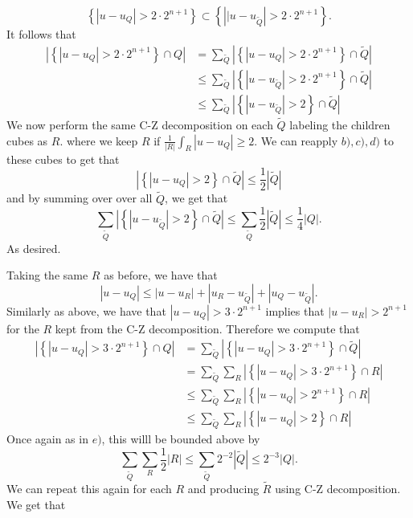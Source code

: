 \documentclass[12pt, a4paper]{article}
\theoremstyle{definition}
\begin{document}
$$ \left\{ \left| u-u_Q \right|> 2 \cdot 2^{n+1} \right\} \subset \left\{ \left| |u-u_{\tilde{Q}} \right|>2 \cdot 2^{n+1} \right\}. $$ 
It follows that 
\begin{align*}
	\left| \left\{ \left| u-u_Q \right|>2\cdot 2^{n+1} \right\}\cap Q  \right| & = 	\sum_{\tilde{Q}}\left| \left\{ \left| u-u_Q \right|>2\cdot 2^{n+1} \right\}\cap \tilde{Q}  \right| 
	\\ & \leq \sum_{\tilde{Q}}\left| \left\{ \left| u-u_{\tilde{Q}} \right|>2\cdot 2^{n+1} \right\}\cap \tilde{Q}  \right|
	\\ & \leq \sum_{\tilde{Q}}\left| \left\{ \left| u-u_{\tilde{Q}} \right|>2 \right\}\cap \tilde{Q}  \right|
\end{align*}
We now perform the same C-Z decomposition on each $\tilde{Q}$ labeling the children cubes as $R$. where we keep $R$ if $ \frac{1}{|R|}\int_R |u-u_Q| \geq 2 $. We can reapply $b),c),d)$ to these cubes to get that 
$$ \left| \left\{ \left| u-u_Q \right|>2 \right\}\cap \tilde{Q} \right|\leq \frac{1}{2}|\tilde{Q}| $$ 
and by summing over over all $ \tilde{Q}$, we get that 
$$\sum_{\tilde{Q}} \left| \left\{ \left| u-u_{\tilde{Q}} \right|>2 \right\}\cap \tilde{Q}  \right| \leq \sum_{\tilde{Q}} \frac{1}{2}|\tilde{Q}| \leq \frac{1}{4}|Q|. $$ 
As desired. 
\item Taking the same $R$ as before, we have that 
$$ \left| u-u_Q \right|  \leq |u-u_R| + |u_R - u_{\tilde{Q}}| + |u_Q - u_{\tilde{Q}}|.$$ 
Similarly as above, we have that $|u-u_Q|> 3\cdot 2^{n+1}$ implies that $|u-u_R|>2^{n+1}$ for the $R$ kept from the C-Z decomposition. Therefore we compute that 
\begin{align*}
	\left| \left\{ \left| u-u_Q \right|>3\cdot 2^{n+1} \right\}\cap Q \right| & = \sum_{\tilde{Q}}	\left| \left\{ \left| u-u_Q \right|>3\cdot 2^{n+1} \right\}\cap \tilde{Q} \right| 
	\\ & = \sum_{\tilde{Q}} \sum_R 	\left| \left\{ \left| u-u_Q \right|>3\cdot 2^{n+1} \right\}\cap R \right| 
	\\ & \leq \sum_{\tilde{Q}} \sum_R \left| \left\{ \left| u-u_Q \right|> 2^{n+1} \right\}\cap R \right| 
	\\ & \leq \sum_{\tilde{Q}} \sum_R \left| \left\{ \left| u-u_Q \right|> 2 \right\}\cap R \right| 
\end{align*}
Once again as in $e)$, this willl be bounded above by 
$$ \sum_{\tilde{Q}} \sum_R \frac{1}{2}|R| \leq \sum_{\tilde{Q}} 2^{-2} |\tilde{Q}| \leq2^{-3} |Q|. $$ 
We can repeat this again for each $R$ and producing $\tilde{R}$ using C-Z decomposition. We get that
\end{document}
